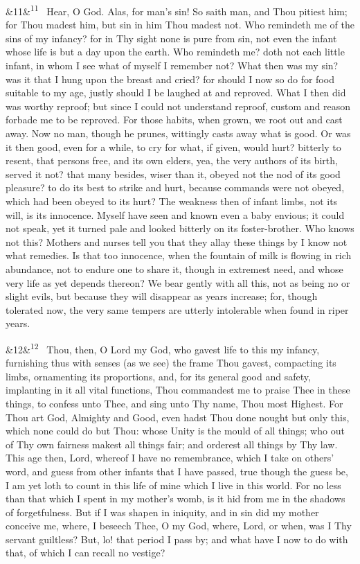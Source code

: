 \documentclass[12pt]{article}
\newcommand{\para}[1][]{\par\noindent\ifx&#1&\else\textsuperscript{\footnotesize #1}~\fi}
\begin{document}
\para[11] Hear, O God. Alas, for man's sin! So saith man, and Thou pitiest him; for Thou madest him, but sin in him Thou madest not. Who remindeth me of the sins of my infancy? for in Thy sight none is pure from sin, not even the infant whose life is but a day upon the earth. Who remindeth me? doth not each little infant, in whom I see what of myself I remember not? What then was my sin? was it that I hung upon the breast and cried? for should I now so do for food suitable to my age, justly should I be laughed at and reproved. What I then did was worthy reproof; but since I could not understand reproof, custom and reason forbade me to be reproved. For those habits, when grown, we root out and cast away. Now no man, though he prunes, wittingly casts away what is good. Or was it then good, even for a while, to cry for what, if given, would hurt? bitterly to resent, that persons free, and its own elders, yea, the very authors of its birth, served it not? that many besides, wiser than it, obeyed not the nod of its good pleasure? to do its best to strike and hurt, because commands were not obeyed, which had been obeyed to its hurt? The weakness then of infant limbs, not its will, is its innocence. Myself have seen and known even a baby envious; it could not speak, yet it turned pale and looked bitterly on its foster-brother. Who knows not this? Mothers and nurses tell you that they allay these things by I know not what remedies. Is that too innocence, when the fountain of milk is flowing in rich abundance, not to endure one to share it, though in extremest need, and whose very life as yet depends thereon? We bear gently with all this, not as being no or slight evils, but because they will disappear as years increase; for, though tolerated now, the very same tempers are utterly intolerable when found in riper years.

\para[12] Thou, then, O Lord my God, who gavest life to this my infancy, furnishing thus with senses (as we see) the frame Thou gavest, compacting its limbs, ornamenting its proportions, and, for its general good and safety, implanting in it all vital functions, Thou commandest me to praise Thee in these things, to confess unto Thee, and sing unto Thy name, Thou most Highest. For Thou art God, Almighty and Good, even hadst Thou done nought but only this, which none could do but Thou: whose Unity is the mould of all things; who out of Thy own fairness makest all things fair; and orderest all things by Thy law. This age then, Lord, whereof I have no remembrance, which I take on others' word, and guess from other infants that I have passed, true though the guess be, I am yet loth to count in this life of mine which I live in this world. For no less than that which I spent in my mother's womb, is it hid from me in the shadows of forgetfulness. But if I was shapen in iniquity, and in sin did my mother conceive me, where, I beseech Thee, O my God, where, Lord, or when, was I Thy servant guiltless? But, lo! that period I pass by; and what have I now to do with that, of which I can recall no vestige?
\end{document}
